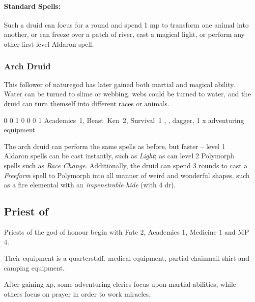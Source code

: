 {\begin{multicols}{2}
\paragraph{Standard Spells:}
Such a druid can focus for a round and spend 1 \gls{mp} to transform one animal into another, or can freeze over a patch of river, cast a magical light, or perform any other first level Aldaron spell.

\subsubsection{Arch Druid}

This follower of \gls{naturegod} has later gained both martial and magical ability.
Water can be turned to slime or webbing, webs could be turned to water, and the druid can turn themself into different races or animals.


{0}%
{0}%
{{1}%
{0}%
{0}}%
{0}%
{1}%
{Academics~1, Beast~Ken~2, Survival~1}%
{\spear, \partialleather, dagger, 1 x adventuring equipment}%
{}

The arch druid can perform the same spells as before, but faster -- level 1 Aldaron spells can be cast instantly, such as \textit{Light}; as can level 2 Polymorph spells such as \textit{Race Change}.
Additionally, the druid can spend 3 rounds to cast a \textit{Freeform} spell to Polymorph into all manner of weird and wonderful shapes, such as a fire elemental with an \textit{impenetrable hide} (with 4 \gls{dr}).

\subsection{Priest of }

Priests of the god of honour begin with Fate 2, Academics 1, Medicine 1 and MP 4.

Their equipment is a quarterstaff, medical equipment, partial chainmail shirt and camping equipment.

After gaining \gls{xp}, some adventuring clerics focus upon martial abilities, while others focus on prayer in order to work miracles.



\end{multicols}}
